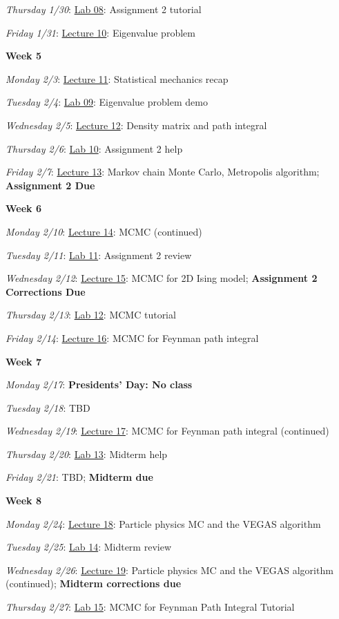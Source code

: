\documentclass[12pt]{article}
\begin{document}
\emph{Thursday 1/30}: \underline{Lab 08}: Assignment 2 tutorial

\emph{Friday 1/31}: \underline{Lecture 10}: Eigenvalue problem

\noindent\textbf{Week 5}

\emph{Monday 2/3}: \underline{Lecture 11}: Statistical mechanics recap

\emph{Tuesday 2/4}: \underline{Lab 09}: Eigenvalue problem demo

\emph{Wednesday 2/5}: \underline{Lecture 12}: Density matrix and path integral

\emph{Thursday 2/6}: \underline{Lab 10}: Assignment 2 help

\emph{Friday 2/7}: \underline{Lecture 13}: Markov chain Monte Carlo, Metropolis algorithm; \textbf{Assignment 2 Due}

\noindent\textbf{Week 6}

\emph{Monday 2/10}: \underline{Lecture 14}: MCMC (continued)

\emph{Tuesday 2/11}: \underline{Lab 11}: Assignment 2 review

\emph{Wednesday 2/12}: \underline{Lecture 15}: MCMC for 2D Ising model; \textbf{Assignment 2 Corrections Due}

\emph{Thursday 2/13}: \underline{Lab 12}: MCMC tutorial

\emph{Friday 2/14}: \underline{Lecture 16}: MCMC for Feynman path integral

\noindent\textbf{Week 7}

\emph{Monday 2/17}: \textbf{Presidents' Day: No class}

\emph{Tuesday 2/18}: TBD

\emph{Wednesday 2/19}: \underline{Lecture 17}: MCMC for Feynman path integral (continued)

\emph{Thursday 2/20}: \underline{Lab 13}: Midterm help

\emph{Friday 2/21}: TBD; \textbf{Midterm due}

\noindent\textbf{Week 8}

\emph{Monday 2/24}: \underline{Lecture 18}: Particle physics MC and the VEGAS algorithm

\emph{Tuesday 2/25}: \underline{Lab 14}: Midterm review

\emph{Wednesday 2/26}: \underline{Lecture 19}: Particle physics MC and the VEGAS algorithm (continued); \textbf{Midterm corrections due}

\emph{Thursday 2/27}: \underline{Lab 15}: MCMC for Feynman Path Integral Tutorial
\end{document}

